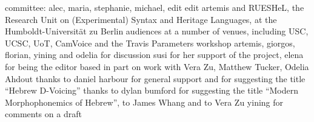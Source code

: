 \addchap{\lsAcknowledgementTitle} 

committee: alec, maria, stephanie, michael, edit
edit
artemis and RUESHeL, the Research Unit on (Experimental) Syntax and Heritage Languages, at the Humboldt-Universit\"at zu Berlin
audiences at a number of venues, including USC, UCSC, UoT, CamVoice and the Travis Parameters workshop
artemis, giorgos, florian, yining and odelia for discussion
susi for her support of the project, elena for being the editor
based in part on work with Vera Zu, Matthew Tucker, Odelia Ahdout
thanks to daniel harbour for general support and for suggesting the title ``Hebrew D-Voicing''
thanks to dylan bumford for suggesting the title ``Modern Morphophonemics of Hebrew'', to James Whang and to Vera Zu
yining for comments on a draft